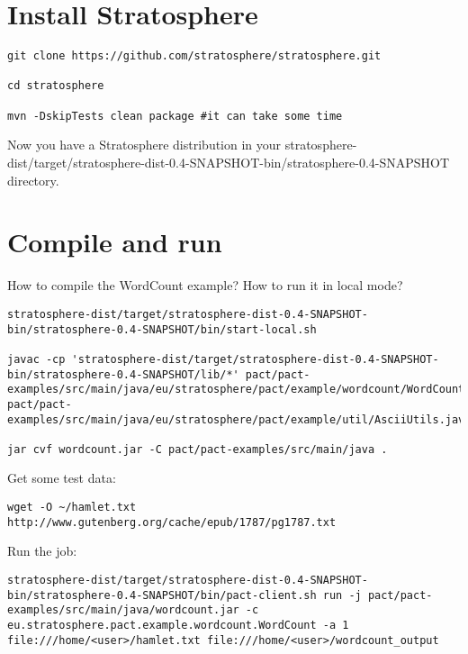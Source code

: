 \documentclass[12pt]{article}
\title{\center{Stratosphere hackathon}}
\date{}
\author{}
\begin{document}

\section{Install Stratosphere}

\begin{verbatim}
git clone https://github.com/stratosphere/stratosphere.git

cd stratosphere

mvn -DskipTests clean package #it can take some time
\end{verbatim}

Now you have a Stratosphere distribution in your stratosphere-dist/target/stratosphere-dist-0.4-SNAPSHOT-bin/stratosphere-0.4-SNAPSHOT directory.

\section{Compile and run}

How to compile the WordCount example? How to run it in local mode?

\begin{verbatim}
stratosphere-dist/target/stratosphere-dist-0.4-SNAPSHOT-bin/stratosphere-0.4-SNAPSHOT/bin/start-local.sh

javac -cp 'stratosphere-dist/target/stratosphere-dist-0.4-SNAPSHOT-bin/stratosphere-0.4-SNAPSHOT/lib/*' pact/pact-examples/src/main/java/eu/stratosphere/pact/example/wordcount/WordCount.java pact/pact-examples/src/main/java/eu/stratosphere/pact/example/util/AsciiUtils.java

jar cvf wordcount.jar -C pact/pact-examples/src/main/java .
\end{verbatim}

Get some test data:

\begin{verbatim}
wget -O ~/hamlet.txt http://www.gutenberg.org/cache/epub/1787/pg1787.txt
\end{verbatim}

Run the job:

\begin{verbatim}
stratosphere-dist/target/stratosphere-dist-0.4-SNAPSHOT-bin/stratosphere-0.4-SNAPSHOT/bin/pact-client.sh run -j pact/pact-examples/src/main/java/wordcount.jar -c eu.stratosphere.pact.example.wordcount.WordCount -a 1 file:///home/<user>/hamlet.txt file:///home/<user>/wordcount_output
\end{verbatim}
\end{document}
